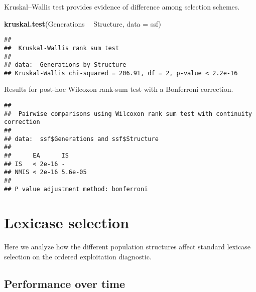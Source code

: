 \documentclass[]{book}
\newenvironment{Shaded}{\begin{snugshade}}{\end{snugshade}}
\newcommand{\DataTypeTok}[1]{\textcolor[rgb]{0.13,0.29,0.53}{#1}}
\newcommand{\KeywordTok}[1]{\textcolor[rgb]{0.13,0.29,0.53}{\textbf{#1}}}
\newcommand{\NormalTok}[1]{#1}
\newcommand{\OperatorTok}[1]{\textcolor[rgb]{0.81,0.36,0.00}{\textbf{#1}}}
\newcommand{\OtherTok}[1]{\textcolor[rgb]{0.56,0.35,0.01}{#1}}
\newcommand{\StringTok}[1]{\textcolor[rgb]{0.31,0.60,0.02}{#1}}
\begin{document}
Kruskal--Wallis test provides evidence of difference among selection schemes.

\begin{Shaded}
\begin{Highlighting}[]
\KeywordTok{kruskal.test}\NormalTok{(Generations }\OperatorTok{~}\StringTok{ }\NormalTok{Structure, }\DataTypeTok{data =}\NormalTok{ ssf)}
\end{Highlighting}
\end{Shaded}

\begin{verbatim}
## 
##  Kruskal-Wallis rank sum test
## 
## data:  Generations by Structure
## Kruskal-Wallis chi-squared = 206.91, df = 2, p-value < 2.2e-16
\end{verbatim}

Results for post-hoc Wilcoxon rank-sum test with a Bonferroni correction.

\begin{Shaded}
\end{Shaded}

\begin{verbatim}
## 
##  Pairwise comparisons using Wilcoxon rank sum test with continuity correction 
## 
## data:  ssf$Generations and ssf$Structure 
## 
##      EA      IS     
## IS   < 2e-16 -      
## NMIS < 2e-16 5.6e-05
## 
## P value adjustment method: bonferroni
\end{verbatim}

\hypertarget{lexicase-selection-9}{%
\section{Lexicase selection}\label{lexicase-selection-9}}

Here we analyze how the different population structures affect standard lexicase selection on the ordered exploitation diagnostic.

\hypertarget{performance-over-time-23}{%
\subsection{Performance over time}\label{performance-over-time-23}}
\end{document}
